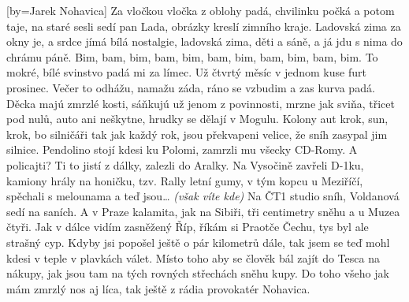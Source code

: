 [by={Jarek Nohavica}]
\freev
\chordsoff
Za vločkou vločka z oblohy padá,
chvilinku počká a potom taje,
na staré sesli sedí pan Lada,
obrázky kreslí zimního kraje.
\cl
\chordsoff
\chor
Ladovská zima za okny je,
a srdce jímá bílá nostalgie,
ladovská zima, děti a sáně,
a já jdu s nima do chrámu páně.
Bim, bam, bim, bam, bim, bam,
bim, bam, bim, bam, bim.
\cl
\freev
To mokré, bílé svinstvo padá mi za límec.
Už čtvrtý měsíc v jednom kuse furt prosinec.
Večer to odhážu, namažu záda,
ráno se vzbudim a zas kurva padá.
Děcka majú zmrzlé kosti,
sáňkujú už jenom z povinnosti,
mrzne jak sviňa, třicet pod nulů,
auto ani neškytne, hrudky se dělají v Mogulu.
Kolony aut krok, sun, krok,
bo silničáři tak jak každý rok,
jsou překvapeni velice,
že sníh zasypal jim silnice.
Pendolino stojí kdesi ku Polomi,
zamrzli mu všecky CD-Romy.
A policajti? Ti to jistí z dálky,
zalezli do Aralky.
\cl
\repchorus{\emptyspace}
\freev
Na Vysočině zavřeli D-1ku,
kamiony hrály na honičku,
tzv. Rally letní gumy,
v tým kopcu u Meziříčí,
spěchali s melounama a teď jsou… \emph{(však víte kde)}
Na ČT1 studio sníh,
Voldanová sedí na saních.
A v Praze kalamita, jak na Sibiři,
tři centimetry sněhu a u Muzea čtyři.
Jak v dálce vidím zasněžený Říp,
říkám si Praotče Čechu, tys byl ale strašný cyp.
Kdyby jsi popošel ještě o pár kilometrů dále,
tak jsem se teď mohl kdesi v teple v plavkách válet.
Místo toho aby se člověk bál zajít do Tesca na nákupy,
jak jsou tam na tých rovných střechách sněhu kupy.
Do toho všeho jak mám zmrzlý nos aj líca,
tak ještě z rádia provokatér Nohavica.
\cl
\repchorus{\emptyspace}
\endsong


